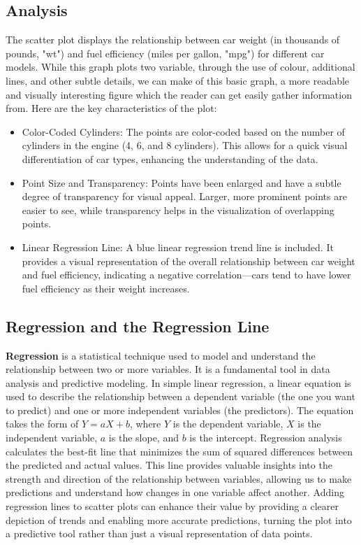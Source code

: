 \documentclass{article}\usepackage[]{graphicx}\usepackage[]{xcolor}
\begin{document}
\subsection{Analysis}
The scatter plot displays the relationship between car weight (in thousands of pounds, "wt") and fuel efficiency (miles per gallon, "mpg") for different car models. While this graph plots two variable, through the use of colour, additional lines, and other subtle details, we can make of this basic graph, a more readable and visually interesting figure which the reader can get easily gather information from. Here are the key characteristics of the plot:
\begin{itemize}
    \item Color-Coded Cylinders: The points are color-coded based on the number of cylinders in the engine (4, 6, and 8 cylinders). This allows for a quick visual differentiation of car types, enhancing the understanding of the data.
    \item Point Size and Transparency: Points have been enlarged and have a subtle degree of transparency for visual appeal. Larger, more prominent points are easier to see, while transparency helps in the visualization of overlapping points.
    \item Linear Regression Line: A blue linear regression trend line is included. It provides a visual representation of the overall relationship between car weight and fuel efficiency, indicating a negative correlation—cars tend to have lower fuel efficiency as their weight increases.\\
\end{itemize}

\subsection{Regression and the Regression Line}
\textbf{Regression} is a statistical technique used to model and understand the relationship between two or more variables. It is a fundamental tool in data analysis and predictive modeling. In simple linear regression, a linear equation is used to describe the relationship between a dependent variable (the one you want to predict) and one or more independent variables (the predictors). The equation takes the form of \(Y = aX + b\), where \(Y\) is the dependent variable, \(X\) is the independent variable, \(a\) is the slope, and \(b\) is the intercept. Regression analysis calculates the best-fit line that minimizes the sum of squared differences between the predicted and actual values. This line provides valuable insights into the strength and direction of the relationship between variables, allowing us to make predictions and understand how changes in one variable affect another. Adding regression lines to scatter plots can enhance their value by providing a clearer depiction of trends and enabling more accurate predictions, turning the plot into a predictive tool rather than just a visual representation of data points.
\end{document}
